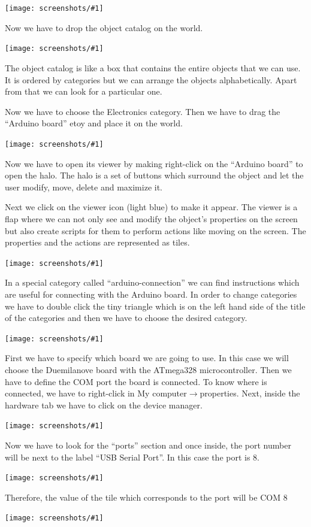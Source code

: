 \documentclass[a4paper,12pt]{article}
\newcommand{\screenshot}[1]
{
\begin{center}
	\texttt{[image: screenshots/\#1]}
\end{center}
}
\begin{document}
\screenshot{02.png}

Now we have to drop the object catalog on the world. 

\screenshot{03.png}

The object catalog is like a box that contains the entire objects that we can
use. It is ordered by categories but we can arrange the objects alphabetically.
Apart from that we can look for a particular one.

Now we have to choose the Electronics category. Then we have to drag the
“Arduino board” etoy and place it on the world.

\screenshot{04.png}
  
Now we have to open its viewer by making right-click on the “Arduino board” to
open the halo. The halo is a set of buttons which surround the object and let
the user modify, move, delete and maximize it.  

Next we click on the viewer icon (light blue) to make it appear. The viewer is
a flap where we can not only see and modify the object’s properties on the
screen but also create scripts for them to perform actions like moving on the
screen. The properties and the actions are represented as tiles.

\screenshot{05.png}


In a special category called “arduino-connection” we can find instructions
which are useful for connecting with the Arduino board. In order to change
categories we have to double click the tiny triangle which is on the left hand
side of the title of the categories and then we have to choose the desired
category. 

\screenshot{06.png}

First we have to specify which board we are going to use.  In this case we will
choose the Duemilanove board with the ATmega328 microcontroller. Then we have
to define the COM port the board is connected. To know where is connected, we
have to right-click in My computer$\rightarrow$properties. Next, inside the
hardware tab we have to click on the device manager. 

\screenshot{07.png}

Now we have to look for the “ports” section and once inside, the port number
will be next to the label “USB Serial Port”. In this case the port is 8. 
 
\screenshot{08.png}

Therefore, the value of the tile which corresponds to the port will be COM 8

\screenshot{09.png}
\end{document}
